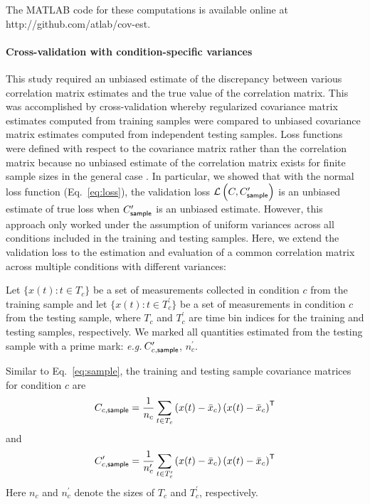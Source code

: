 \documentclass[10pt]{article}
\newcommand{\loss}[1]{\mathcal L\left(#1\right)}
\newcommand{\T}{{\sf T}}
\begin{document}
The MATLAB code for these computations is available online at http://github.com/atlab/cov-est.

\paragraph{Cross-validation with condition-specific variances}
This study required an unbiased estimate of the discrepancy between various correlation matrix estimates and the true value of the correlation matrix. This was accomplished by cross-validation whereby regularized covariance matrix estimates computed from training samples were compared to unbiased covariance matrix estimates computed from independent testing samples. Loss functions were defined with respect to the covariance matrix rather than the correlation matrix because no unbiased estimate of the correlation matrix exists for finite sample sizes in the general case \cite{Fisher:1921}. In particular, we showed that with the normal loss function (Eq.~\ref{eq:loss}), the validation loss $\loss{C,C_{\sf sample}^\prime}$ is an unbiased estimate of true loss when $C_{\sf sample}^\prime$ is an unbiased estimate. However, this approach only worked under the assumption of uniform variances across all conditions included in the training and testing samples.  Here, we extend the validation loss to the estimation and evaluation of a common correlation matrix across multiple conditions with different variances:

Let $\{x(t):t\in T_c\}$ be a set of measurements collected in condition $c$ from the training sample and let $\{x(t):t \in T_c^\prime\}$ be a set of measurements in condition $c$ from the testing sample, where $T_c$ and $T_c^\prime$ are time bin indices for the training and testing samples, respectively. We marked all quantities estimated from the testing sample with a prime mark: \emph{e.g.}\,$C_{c,\sf sample}^\prime$, $n_c^\prime$.

Similar to Eq.~\ref{eq:sample}, the training and testing sample covariance matrices for condition $c$ are
\begin{equation}
	C_{c,{\sf sample}}
	= \frac 1{n_c} \sum\limits_{t\in T_c}\left(x(t)-\bar x_c\right)\left(x(t)-\bar x_c\right)^\T
\end{equation}
and
\begin{equation}
	C_{c,{\sf sample}}^\prime
	= \frac 1{n_c^\prime} \sum\limits_{t\in T_c^\prime}\left(x(t)-\bar x_c\right)\left(x(t)-\bar x_c\right)^\T
\end{equation}
Here $n_c$ and $n_c^\prime$ denote the sizes of $T_c$ and $T_c^\prime$, respectively. 
\end{document}
